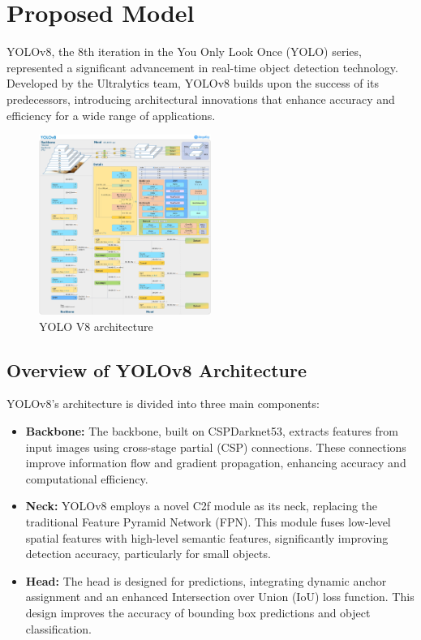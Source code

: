 \documentclass[conference]{IEEEtran}
\begin{document}

\section{Proposed Model}
YOLOv8, the 8th iteration in the You Only Look Once (YOLO) series, represented a significant advancement in real-time object detection technology. Developed by the Ultralytics team\cite{ultralytics2023yolov8explained}, YOLOv8 builds upon the success of its predecessors, introducing architectural innovations that enhance accuracy and efficiency for a wide range of applications.
\begin{figure}[H]
    \centering
    \includegraphics[width=0.5\textwidth]{yolov8-arch.jpg} 
    \caption{YOLO V8 architecture\cite{ultralytics2023yolov8} }
    \label{fig:metadata-schema}
\end{figure}
\subsection{Overview of YOLOv8 Architecture}
YOLOv8’s architecture is divided into three main components:
\begin{itemize}
    \item \textbf{Backbone:} The backbone, built on CSPDarknet53, extracts features from input images using cross-stage partial (CSP) connections. These connections improve information flow and gradient propagation, enhancing accuracy and computational efficiency.
    \item \textbf{Neck:} YOLOv8 employs a novel C2f module as its neck, replacing the traditional Feature Pyramid Network (FPN). This module fuses low-level spatial features with high-level semantic features, significantly improving detection accuracy, particularly for small objects.
    \item \textbf{Head:} The head is designed for predictions, integrating dynamic anchor assignment and an enhanced Intersection over Union (IoU) loss function. This design improves the accuracy of bounding box predictions and object classification.
\end{itemize}
\end{document}
